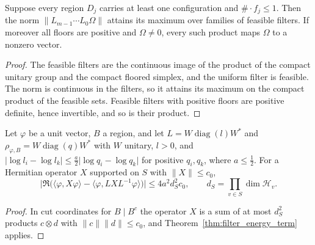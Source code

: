 \begin{proposition}
    \label{prop:filter_maximizer}
    \leanok
    Suppose every region $D_j$ carries at least one configuration and
    $\#\cdot f_j\le 1$. Then the norm $\lVert L_{m-1}\cdots L_0\Omega\rVert$
    attains its maximum over families of feasible filters. If moreover all floors
    are positive and $\Omega\ne0$, every such product maps $\Omega$ to a nonzero
    vector.
\end{proposition}
\begin{proof}\leanok
    The feasible filters are the continuous image of the product of the compact
    unitary group and the compact floored simplex, and the uniform filter is
    feasible. The norm is continuous in the filters, so it attains its maximum
    on the compact product of the feasible sets. Feasible filters with positive
    floors are positive definite, hence invertible, and so is their product.
\end{proof}

\begin{lemma}
    \label{lem:split_filter_conjugation}
    \leanok
    Let $\varphi$ be a unit vector, $B$ a region, and let $L=W\operatorname{diag}(l)W^*$ and
    $\rho_{\varphi,B}=W\operatorname{diag}(q)W^*$ with $W$ unitary, $l>0$, and
    $\lvert\log l_i-\log l_k\rvert\le\tfrac a2\lvert\log q_i-\log q_k\rvert$ for positive
    $q_i,q_k$, where $a\le\tfrac12$. For a Hermitian operator $X$ supported on $S$ with
    $\lVert X\rVert\le c_0$,
    \[
        \bigl\lvert\Re\bigl(\langle\varphi,X\varphi\rangle
        -\langle\varphi,LXL^{-1}\varphi\rangle\bigr)\bigr\rvert
        \le 4a^2d_S^2c_0,\qquad d_S=\prod_{v\in S}\dim\mathcal H_v.
    \]
\end{lemma}
\begin{proof}\leanok
    In cut coordinates for $B\mid B^c$ the operator $X$ is a sum of at most $d_S^2$ products
    $c\otimes d$ with $\lVert c\rVert\lVert d\rVert\le c_0$, and
    Theorem~\ref{thm:filter_energy_term} applies.
\end{proof}

